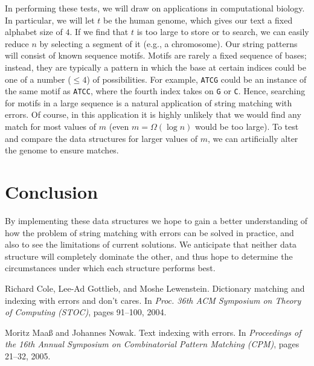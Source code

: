 \documentclass[11pt]{article}
\begin{document}

In performing these tests, we will draw on applications in computational biology.
In particular, we will let $t$ be the human genome, which gives our text a fixed alphabet size of $4$.
If we find that $t$ is too large to store or to search, we can easily reduce $n$ by selecting a segment of it (e.g., a chromosome).
Our string patterns will consist of known sequence motifs.
Motifs are rarely a fixed sequence of bases; instead, they are typically a pattern in which the base at certain indices could be one of a number ($\leq 4$) of possibilities.
For example, \texttt{ATCG} could be an instance of the same motif as \texttt{ATCC}, where the fourth index takes on \texttt{G} or \texttt{C}.
Hence, searching for motifs in a large sequence is a natural application of string matching with errors.
Of course, in this application it is highly unlikely that we would find any match for most values of $m$ (even $m = \Omega(\log n)$ would be too large).
To test and compare the data structures for larger values of $m$, we can artificially alter the genome to ensure matches.

\section{Conclusion}

By implementing these data structures we hope to gain a better understanding of how the problem of string matching with errors can be solved in practice, and also to see the limitations of current solutions.
We anticipate that neither data structure will completely dominate the other, and thus hope to determine the circumstances under which each structure performs best.

\begin{thebibliography}{9}
Richard Cole, Lee-Ad Gottlieb, and Moshe Lewenstein.
 Dictionary matching and indexing with errors and don't cares.
 In \textit{Proc. 36th ACM Symposium on Theory of Computing (STOC)},
 pages 91--100, 2004.
 
Moritz Maa{\ss} and Johannes Nowak.
 Text indexing with errors.
 In \textit{Proceedings of the 16th Annual Symposium on Combinatorial Pattern Matching (CPM)},
 pages 21--32, 2005.
 
\end{thebibliography}
\end{document}
